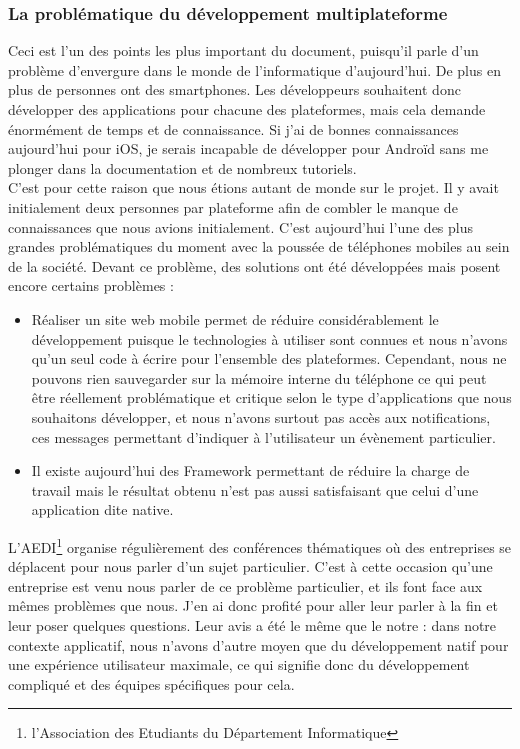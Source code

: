 \documentclass{article}
\begin{document}
\subsubsection{La problématique du développement multiplateforme}
		Ceci est l'un des points les plus important du document, puisqu'il parle d'un problème d'envergure dans le monde de l'informatique d'aujourd'hui. De plus en plus de personnes ont des smartphones. Les développeurs souhaitent donc développer des applications pour chacune des plateformes, mais cela demande énormément de temps et de connaissance. Si j'ai de bonnes connaissances aujourd'hui pour iOS, je serais incapable de développer pour Androïd sans me plonger dans la documentation et de nombreux tutoriels. \\
		
		C'est pour cette raison que nous étions autant de monde sur le projet. Il y avait initialement deux personnes par plateforme afin de combler le manque de connaissances que nous avions initialement.  C'est aujourd'hui l'une des plus grandes problématiques du moment avec la poussée de téléphones mobiles au sein de la société. Devant ce problème, des solutions ont été développées mais posent encore certains problèmes : 
		\begin{itemize}
			\item Réaliser un site web mobile permet de réduire considérablement le développement puisque le technologies à utiliser sont connues et nous n'avons qu'un seul code à écrire pour l'ensemble des plateformes. Cependant, nous ne pouvons rien sauvegarder sur la mémoire interne du téléphone ce qui peut être réellement problématique et critique selon le type d'applications que nous souhaitons développer, et nous n'avons surtout pas accès aux notifications, ces messages permettant d'indiquer à l'utilisateur un évènement particulier. 
			\item Il existe aujourd'hui des Framework permettant de réduire la charge de travail mais le résultat obtenu n'est pas aussi satisfaisant que celui d'une application dite native.\\
		\end{itemize}
		
		L'AEDI\footnote{l'Association des Etudiants du Département Informatique} organise régulièrement des conférences thématiques où des entreprises se déplacent pour nous parler d'un sujet particulier. C'est à cette occasion qu'une entreprise est venu nous parler de ce problème particulier, et ils font face aux mêmes problèmes que nous. J'en ai donc profité pour aller leur parler à la fin et leur poser quelques questions. Leur avis a été le même que le notre : dans notre contexte applicatif, nous n'avons d'autre moyen que du développement natif pour une expérience utilisateur maximale, ce qui signifie donc du développement compliqué et des équipes spécifiques pour cela.
		
\end{document}
